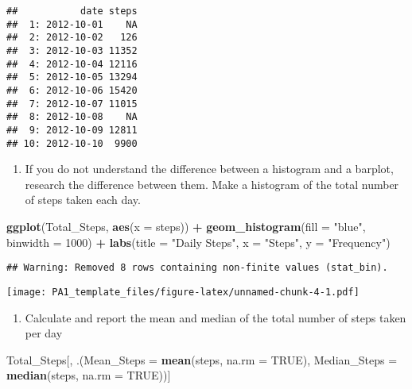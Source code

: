 \documentclass[
]{article}
\newenvironment{Shaded}{\begin{snugshade}}{\end{snugshade}}
\newcommand{\DataTypeTok}[1]{\textcolor[rgb]{0.13,0.29,0.53}{#1}}
\newcommand{\DecValTok}[1]{\textcolor[rgb]{0.00,0.00,0.81}{#1}}
\newcommand{\KeywordTok}[1]{\textcolor[rgb]{0.13,0.29,0.53}{\textbf{#1}}}
\newcommand{\NormalTok}[1]{#1}
\newcommand{\OperatorTok}[1]{\textcolor[rgb]{0.81,0.36,0.00}{\textbf{#1}}}
\newcommand{\OtherTok}[1]{\textcolor[rgb]{0.56,0.35,0.01}{#1}}
\newcommand{\StringTok}[1]{\textcolor[rgb]{0.31,0.60,0.02}{#1}}
\providecommand{\tightlist}{%
  \setlength{\itemsep}{0pt}\setlength{\parskip}{0pt}}
\begin{document}
\begin{verbatim}
##           date steps
##  1: 2012-10-01    NA
##  2: 2012-10-02   126
##  3: 2012-10-03 11352
##  4: 2012-10-04 12116
##  5: 2012-10-05 13294
##  6: 2012-10-06 15420
##  7: 2012-10-07 11015
##  8: 2012-10-08    NA
##  9: 2012-10-09 12811
## 10: 2012-10-10  9900
\end{verbatim}

\begin{enumerate}
\def\labelenumi{\arabic{enumi}.}
\setcounter{enumi}{1}
\tightlist
\item
  If you do not understand the difference between a histogram and a
  barplot, research the difference between them. Make a histogram of the
  total number of steps taken each day.
\end{enumerate}

\begin{Shaded}
\begin{Highlighting}[]
\KeywordTok{ggplot}\NormalTok{(Total_Steps, }\KeywordTok{aes}\NormalTok{(}\DataTypeTok{x =}\NormalTok{ steps)) }\OperatorTok{+}
\StringTok{    }\KeywordTok{geom_histogram}\NormalTok{(}\DataTypeTok{fill =} \StringTok{"blue"}\NormalTok{, }\DataTypeTok{binwidth =} \DecValTok{1000}\NormalTok{) }\OperatorTok{+}
\StringTok{    }\KeywordTok{labs}\NormalTok{(}\DataTypeTok{title =} \StringTok{"Daily Steps"}\NormalTok{, }\DataTypeTok{x =} \StringTok{"Steps"}\NormalTok{, }\DataTypeTok{y =} \StringTok{"Frequency"}\NormalTok{)}
\end{Highlighting}
\end{Shaded}

\begin{verbatim}
## Warning: Removed 8 rows containing non-finite values (stat_bin).
\end{verbatim}

\texttt{[image: PA1\_template\_files/figure-latex/unnamed-chunk-4-1.pdf]}

\begin{enumerate}
\def\labelenumi{\arabic{enumi}.}
\setcounter{enumi}{2}
\tightlist
\item
  Calculate and report the mean and median of the total number of steps
  taken per day
\end{enumerate}

\begin{Shaded}
\begin{Highlighting}[]
\NormalTok{Total_Steps[, .(}\DataTypeTok{Mean_Steps =} \KeywordTok{mean}\NormalTok{(steps, }\DataTypeTok{na.rm =} \OtherTok{TRUE}\NormalTok{), }\DataTypeTok{Median_Steps =} \KeywordTok{median}\NormalTok{(steps, }\DataTypeTok{na.rm =} \OtherTok{TRUE}\NormalTok{))]}
\end{Highlighting}
\end{Shaded}
\end{document}
